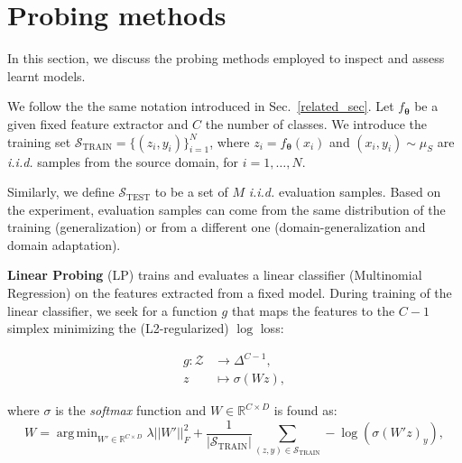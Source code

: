 \documentclass{article}
\DeclareMathOperator*{\argmin}{arg\,min}
\begin{document}
\nocite{langley00}




\newpage
\appendix
\onecolumn

\clearpage
\section{Probing methods}
\label{prob_methods}
In this section, we discuss the probing methods employed to inspect and assess learnt models.

We follow the the same notation introduced in Sec.~\ref{related_sec}. Let $f_{\bm{\theta}}$ be a given fixed feature extractor and $C$ the number of classes. We introduce the training set $\mathcal{S}_{\text{TRAIN}} = \{(z_i, y_i)\}_{i=1}^N$, where $z_i = f_{\bm{\theta}}(x_i)$ and $(x_i, y_i) \sim \mu_S$ are \textit{i.i.d.} samples from the source domain, for $i=1, \ldots, N$.

Similarly, we define $\mathcal{S}_{\text{TEST}}$ to be a set of $M$ \textit{i.i.d.} evaluation samples. Based on the experiment, evaluation samples can come from the same distribution of the training (generalization) or from a different one (domain-generalization and domain adaptation).

\textbf{Linear Probing} (LP) trains and evaluates a linear classifier (Multinomial Regression) on the features extracted from a fixed model. During training of the linear classifier, we seek for a function $g$ that maps the features to the $C-1$ simplex minimizing the (L2-regularized) $\log$ loss:

\begin{align}
    g: \mathcal{Z} &\to \Delta^{C-1}, \\
    z &\mapsto \sigma(Wz),
\end{align}

where $\sigma$ is the \textit{softmax} function and $W \in \mathbb{R}^{C \times D}$ is found as:
\begin{equation*}
    \label{findW}
    W = \argmin_{W' \in \mathbb{R}^{C \times D}} \lambda || W' ||_F^2 +  \frac{1}{|\mathcal{S}_\text{TRAIN}|}\sum_{(z, y) \in \mathcal{S}_\text{TRAIN}}-\log(\sigma(W'z)_{y}),
\end{equation*}
\end{document}

